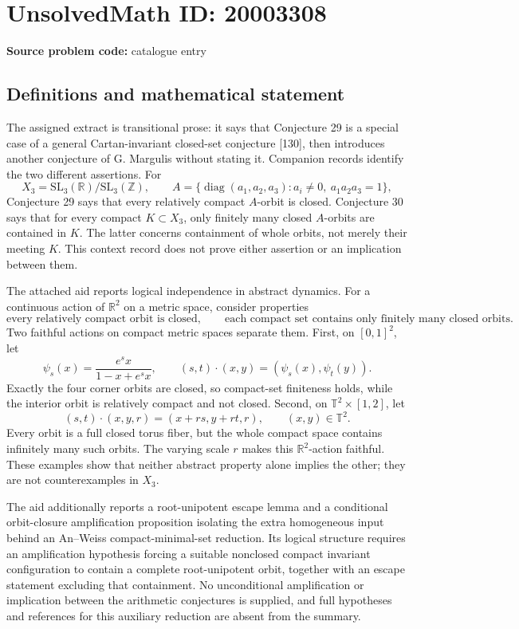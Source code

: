 \documentclass[11pt]{article}
\newcommand{\Z}{\mathbb{Z}}
\newcommand{\R}{\mathbb{R}}
\begin{document}
\section*{UnsolvedMath ID: 20003308}
\textbf{Source problem code:} catalogue entry
\subsection{Definitions and mathematical statement}
The assigned extract is transitional prose: it says that Conjecture 29 is a special case of a general Cartan-invariant closed-set conjecture [130], then introduces another conjecture of G. Margulis without stating it. Companion records identify the two different assertions. For
\[
 X_3=\mathrm{SL}_3(\R)/\mathrm{SL}_3(\Z),\qquad
 A=\{\operatorname{diag}(a_1,a_2,a_3):a_i\ne0,\ a_1a_2a_3=1\},
\]
Conjecture 29 says that every relatively compact $A$-orbit is closed. Conjecture 30 says that for every compact $K\subset X_3$, only finitely many closed $A$-orbits are contained in $K$. The latter concerns containment of whole orbits, not merely their meeting $K$. This context record does not prove either assertion or an implication between them.

The attached aid reports logical independence in abstract dynamics. For a continuous action of $\R^2$ on a metric space, consider properties
\[
 \text{every relatively compact orbit is closed},\qquad
 \text{each compact set contains only finitely many closed orbits}.
\]
Two faithful actions on compact metric spaces separate them. First, on $[0,1]^2$, let
\[
 \psi_s(x)=\frac{e^s x}{1-x+e^s x},\qquad
 (s,t)\cdot(x,y)=(\psi_s(x),\psi_t(y)).
\]
Exactly the four corner orbits are closed, so compact-set finiteness holds, while the interior orbit is relatively compact and not closed. Second, on $\mathbb T^2\times[1,2]$, let
\[
 (s,t)\cdot(x,y,r)=(x+rs,y+rt,r),
 \qquad(x,y)\in\mathbb T^2.
\]
Every orbit is a full closed torus fiber, but the whole compact space contains infinitely many such orbits. The varying scale $r$ makes this $\R^2$-action faithful. These examples show that neither abstract property alone implies the other; they are not counterexamples in $X_3$.

The aid additionally reports a root-unipotent escape lemma and a conditional orbit-closure amplification proposition isolating the extra homogeneous input behind an An--Weiss compact-minimal-set reduction. Its logical structure requires an amplification hypothesis forcing a suitable nonclosed compact invariant configuration to contain a complete root-unipotent orbit, together with an escape statement excluding that containment. No unconditional amplification or implication between the arithmetic conjectures is supplied, and full hypotheses and references for this auxiliary reduction are absent from the summary.
\end{document}

